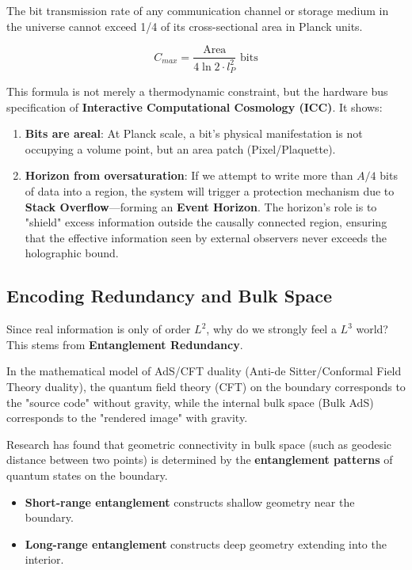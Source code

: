 \begin{theorem}
The bit transmission rate of any communication channel or storage medium in the universe cannot exceed 1/4 of its cross-sectional area in Planck units.

\begin{equation}
C_{max} = \frac{\text{Area}}{4 \ln 2 \cdot l_P^2} \text{ bits}
\end{equation}
\end{theorem}

This formula is not merely a thermodynamic constraint, but the hardware bus specification of \textbf{Interactive Computational Cosmology (ICC)}. It shows:

\begin{enumerate}
\item \textbf{Bits are areal}: At Planck scale, a bit's physical manifestation is not occupying a volume point, but an area patch (Pixel/Plaquette).

\item \textbf{Horizon from oversaturation}: If we attempt to write more than $A/4$ bits of data into a region, the system will trigger a protection mechanism due to \textbf{Stack Overflow}—forming an \textbf{Event Horizon}. The horizon's role is to "shield" excess information outside the causally connected region, ensuring that the effective information seen by external observers never exceeds the holographic bound.
\end{enumerate}

\subsection{Encoding Redundancy and Bulk Space}

Since real information is only of order $L^2$, why do we strongly feel a $L^3$ world? This stems from \textbf{Entanglement Redundancy}.

In the mathematical model of AdS/CFT duality (Anti-de Sitter/Conformal Field Theory duality), the quantum field theory (CFT) on the boundary corresponds to the "source code" without gravity, while the internal bulk space (Bulk AdS) corresponds to the "rendered image" with gravity.

Research has found that geometric connectivity in bulk space (such as geodesic distance between two points) is determined by the \textbf{entanglement patterns} of quantum states on the boundary.

\begin{itemize}
\item \textbf{Short-range entanglement} constructs shallow geometry near the boundary.

\item \textbf{Long-range entanglement} constructs deep geometry extending into the interior.
\end{itemize}

